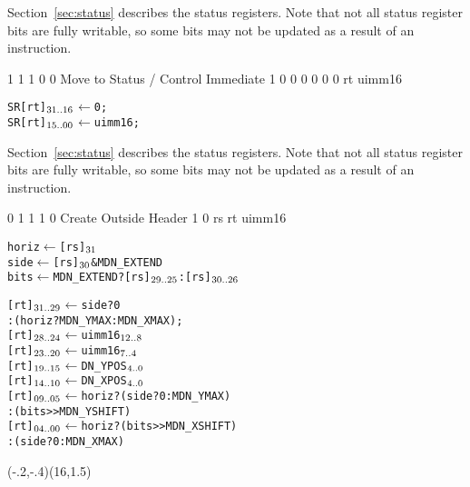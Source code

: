 Section~\ref{sec:status} describes the status registers. Note that not 
all status register bits are fully writable, so some bits may not be updated
as a result of an  instruction. 
\rawInstrEnd

     {1 1 1 0 0}    {Move to Status / Control Immediate} {1} {\RawTag} {0} {0 0 0 0 0} {rt} {uimm16}
\begin{alltt}
        SR[rt]\({\sb{31..16}}\) \(\leftarrow\) 0;
        SR[rt]\({\sb{15..00}}\) \(\leftarrow\) uimm16;
\end{alltt}

Section~\ref{sec:status} describes the status registers. Note that not 
all status register bits are fully writable, so some bits may not be updated
as a result of an  instruction. 
\rawInstrEnd

     {0 1 1 1 0}    {Create Outside Header} {1} {\RawTag} {0} {rs} {rt} {uimm16}
\begin{alltt}
\hspace{.5mm}                              horiz \(\leftarrow\) [rs]\({\sb{31}}\)
\hspace{.5mm}                              side  \(\leftarrow\) [rs]\({\sb{30}}\) & MDN_EXTEND
\hspace{.5mm}                              bits  \(\leftarrow\) MDN_EXTEND ? [rs]\({\sb{29..25}}\) : [rs]\({\sb{30..26}}\)
 
                              [rt]\({\sb{31..29}}\) \(\leftarrow\) side ? 0 
                                               : (horiz ? MDN_YMAX : MDN_XMAX);
                              [rt]\({\sb{28..24}}\) \(\leftarrow\) uimm16\({\sb{12..8}}\)
                              [rt]\({\sb{23..20}}\) \(\leftarrow\) uimm16\({\sb{7..4}}\)
                              [rt]\({\sb{19..15}}\) \(\leftarrow\) DN_YPOS\({\sb{4..0}}\)
                              [rt]\({\sb{14..10}}\) \(\leftarrow\) DN_XPOS\({\sb{4..0}}\)
                              [rt]\({\sb{09..05}}\) \(\leftarrow\) horiz ? (side ? 0 : MDN_YMAX) 
                                                : (bits >> MDN_YSHIFT)
                              [rt]\({\sb{04..00}}\) \(\leftarrow\) horiz ? (bits >> MDN_XSHIFT) 
                                                : (side ? 0 : MDN_XMAX)





\end{alltt}
\pspicture*(-.2,-.4)(16,1.5)
%
\mbtwordnohash%
%
%
%
%
%
%
\endpspicture

